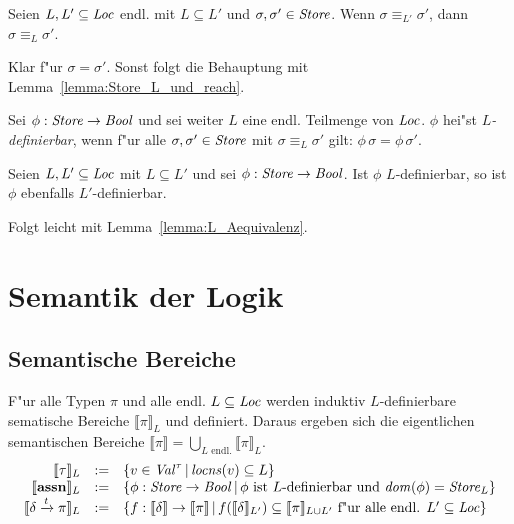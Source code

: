 \documentclass[12pt,a4paper,bigheadings]{scrartcl}
\newcommand{\semantic}[1]{\ensuremath{\llbracket#1\rrbracket}}
\newcommand{\assn}{\ensuremath{\mathbf{assn}}}
\newcommand{\locns}{\name{locns}}
\newcommand{\tto}{\ensuremath{\xrightarrow{t}}}
\begin{document}
\begin{lemma} \label{lemma:L_Aequivalenz}
  Seien $L,L'\subseteq{\text{\it Loc\/}}$ endl. mit $L \subseteq L'$ und $\sigma,\sigma'\in{\text{\it Store\/}}$. Wenn $\sigma \equiv_{L'} \sigma'$,
  dann $\sigma \equiv_L \sigma'$.
\end{lemma}

\begin{beweis}
  Klar f"ur $\sigma = \sigma'$. Sonst folgt die Behauptung mit Lemma~\ref{lemma:Store_L_und_reach}.
\end{beweis}

\begin{definition}[$L$-Definierbarkeit]
  Sei $\phi : {\text{\it Store\/}} \to {\text{\it Bool\/}}$ und sei weiter $L$ eine endl. Teilmenge von ${\text{\it Loc\/}}$.
  $\phi$ hei"st {\em $L$-definierbar}, wenn f"ur alle $\sigma,\sigma'\in{\text{\it Store\/}}$ mit
  $\sigma \equiv_L \sigma'$ gilt: $\phi\,\sigma = \phi\,\sigma'$.
\end{definition}

\begin{lemma} \label{lemma:L_Definierbarkeit}
  Seien $L,L'\subseteq{\text{\it Loc\/}}$ mit $L \subseteq L'$ und sei $\phi:{\text{\it Store\/}} \to {\text{\it Bool\/}}$. Ist $\phi$ $L$-definierbar,
  so ist $\phi$ ebenfalls $L'$-definierbar.
\end{lemma}

\begin{beweis}
  Folgt leicht mit Lemma~\ref{lemma:L_Aequivalenz}.
\end{beweis}


\section{Semantik der Logik}

\subsection{Semantische Bereiche}

F"ur alle Typen $\pi$ und alle endl. $L \subseteq {\text{\it Loc\/}}$ werden induktiv $L$-definierbare
sematische Bereiche $\semantic{\pi}_L$ und definiert. Daraus ergeben sich die eigentlichen
semantischen Bereiche $\semantic{\pi} = \bigcup\limits_{L \text{ endl.}} \semantic{\pi}_L$.
\[\begin{array}{rcl}
  \semantic{\tau}_L &:=& \{v \in \Val^\tau\,|\,\locns(v) \subseteq L\} \\
  \semantic{\assn}_L &:=& \{\phi:\Store\to\Bool\,|\,\text{$\phi$ ist $L$-definierbar und $\dom{\phi}=\Store_L$}\} \\
  \semantic{\delta\tto\pi}_L &:=& \{f:\semantic{\delta}\to\semantic{\pi}\,|\,
                                    f(\semantic{\delta}_{L'}) \subseteq \semantic{\pi}_{L\cup L'}
                                    \text{ f"ur alle endl. $L'\subseteq\Loc$}\} 
\end{array}\]
\end{document}
